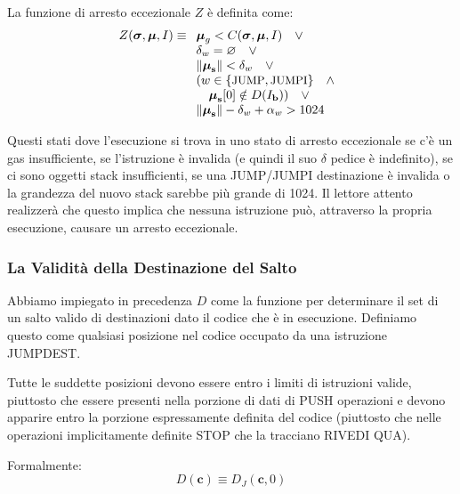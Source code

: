 \documentclass[9pt,oneside]{amsart}
\begin{document}
\begin{multicols}{2}
La funzione di arresto eccezionale $Z$ è definita come:
\begin{equation}
Z(\boldsymbol{\sigma}, \boldsymbol{\mu}, I) \equiv
\begin{array}[t]{l}
\boldsymbol{\mu}_g < C(\boldsymbol{\sigma}, \boldsymbol{\mu}, I) \quad \vee \\
\mathbf{\delta}_w = \varnothing \quad \vee \\
\lVert\boldsymbol{\mu}_\mathbf{s}\rVert < \mathbf{\delta}_w \quad \vee \\
( w \in \{ \text{\small JUMP}, \text{\small JUMPI} \} \quad \wedge \\ \quad \boldsymbol{\mu}_\mathbf{s}[0] \notin D(I_\mathbf{b}) ) \quad \vee \\
\lVert\boldsymbol{\mu}_\mathbf{s}\rVert - \mathbf{\delta}_w + \mathbf{\alpha}_w > 1024 \quad
\end{array}
\end{equation}

Questi stati dove l'esecuzione si trova in uno stato di arresto eccezionale se c'è un gas insufficiente, se l'istruzione è invalida (e quindi il suo $\delta$ pedice è indefinito), se ci sono oggetti stack insufficienti, se una {\small JUMP}/{\small JUMPI} destinazione è invalida o la grandezza del nuovo stack sarebbe più grande di 1024. Il lettore attento realizzerà che questo implica che nessuna istruzione può, attraverso la propria esecuzione, causare un arresto eccezionale.

\subsubsection{La Validità della Destinazione del Salto}

Abbiamo impiegato in precedenza $D$ come la funzione per determinare il set di un salto valido di destinazioni dato il codice che  è in esecuzione. Definiamo questo come qualsiasi posizione nel codice occupato da una istruzione {\small JUMPDEST}.

Tutte le suddette posizioni devono essere entro i limiti di istruzioni valide, piuttosto che essere presenti nella porzione di dati di {\small PUSH} operazioni e devono apparire entro la porzione espressamente definita del codice (piuttosto che nelle operazioni implicitamente definite {\small STOP} che la tracciano RIVEDI QUA).

Formalmente:
\begin{equation}
D(\mathbf{c}) \equiv D_J(\mathbf{c}, 0)
\end{equation}


\end{multicols}
\end{document}
